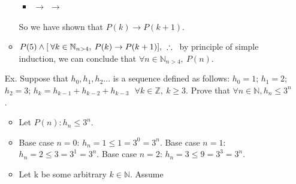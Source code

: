\documentclass[12pt, oneside]{article}
\newcommand\tab[1][0.15cm]{\hspace*{#1}}
\newcommand\imp{\rightarrow}
\newcommand\thfr{\tab \therefore \tab}
\begin{document}
\begin{itemize}
\begin{itemize}
\begin{itemize}
		\item {}  $\imp$  
			 $\imp$  
			\framebox{$ [P(k) \imp P(k+1)]= true$}
		\end{itemize}
		
		So we have shown that $P(k) \imp P(k+1)$.
		
	\item $P(5) \land [\: \forall k \in \mathbb{N}_{n>4}, \: P(k) \imp P(k+1)], \thfr$ by principle of simple induction, we can conclude that $\forall n \in\mathbb{N}_{n>4}, \: P(n)$.	
	\end{itemize}
	
\item [Ex.] Suppose that $h_0, h_1, h_2...$ is a sequence defined as follows: \newline
	\hspace{2em} $h_0 = 1$; \hspace{2em} $h_1 = 2$; \hspace{2em} $h_2 = 3$; \hspace{2em} 
	$h_k = h_{k-1} + h_{k-2} + h_{k-3} \:\:\: \forall k \in \mathbb{Z}, \: k \geq 3$. \newline
	Prove that $\forall n \in \mathbb{N}, h_n \leq 3^n$.
	
	\begin{itemize}
	\item Let $P(n):  h_n \leq 3^n.$
	
	\item Base case $n=0$: $h_n = 1 \leq 1 = 3^0 = 3^n$. \newline
	Base case $n=1$: $h_n = 2 \leq 3 = 3^1 = 3^n$. \newline
	Base case $n=2$: $h_n = 3 \leq 9 = 3^3 = 3^n$.
	
	\item Let k be some arbitrary $k \in \mathbb{N}$. Assume 
	\end{itemize}

\end{itemize}
\end{document}
